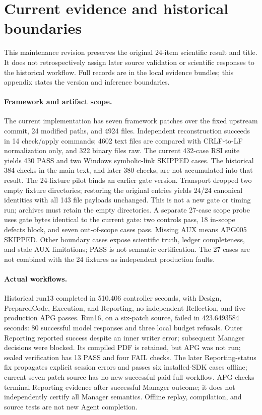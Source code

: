 \section{Current evidence and historical boundaries}
\label{app:current}
This maintenance revision preserves the original 24-item scientific result and title. It does not retrospectively assign later source validation or scientific responses to the historical workflow. Full records are in the local evidence bundles; this appendix states the version and inference boundaries.

\paragraph{Framework and artifact scope.}
The current implementation has seven framework patches over the fixed upstream commit, 24 modified paths, and 4924 files. Independent reconstruction succeeds in 14 check/apply commands; 4602 text files are compared with CRLF-to-LF normalization only, and 322 binary files raw. The current 432-case RSI suite yields 430 PASS and two Windows symbolic-link SKIPPED cases. The historical 384 checks in the main text, and later 380 checks, are not accumulated into that result. The 24-fixture pilot binds an earlier gate version. Transport dropped two empty fixture directories; restoring the original entries yields 24/24 canonical identities with all 143 file payloads unchanged. This is not a new gate or timing run; archives must retain the empty directories. A separate 27-case scope probe uses gate bytes identical to the current gate: two controls pass, 18 in-scope defects block, and seven out-of-scope cases pass. Missing AUX means APG005 SKIPPED. Other boundary cases expose scientific truth, ledger completeness, and stale AUX limitations; PASS is not semantic certification. The 27 cases are not combined with the 24 fixtures as independent production faults.

\paragraph{Actual workflows.}
Historical run13 completed in 510.406 controller seconds, with Design, PreparedCode, Execution, and Reporting, no independent Reflection, and five production APG passes. Run16, on a six-patch source, failed in 423.6493584 seconds: 80 successful model responses and three local budget refusals. Outer Reporting reported success despite an inner writer error; subsequent Manager decisions were blocked. Its compiled PDF is retained, but APG was not run; sealed verification has 13 PASS and four FAIL checks. The later Reporting-status fix propagates explicit session errors and passes six installed-SDK cases offline; current seven-patch source has no new successful paid full workflow. APG checks terminal Reporting evidence after successful Manager outcome; it does not independently certify all Manager semantics. Offline replay, compilation, and source tests are not new Agent completion.

